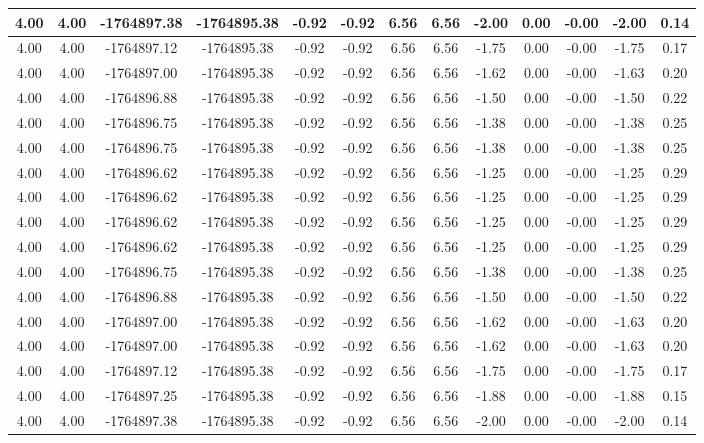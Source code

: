 \begin{table}[htbp]
\begin{adjustbox}{angle=90}
\begin{tabular}{|c|c|c|c|c|c|c|c|c|c|c|c|c|}
 4.00 & 4.00 & -1764897.38 & -1764895.38 & -0.92 & -0.92 & 6.56 & 6.56 & -2.00 & 0.00 & -0.00 & -2.00 & 0.14\\ \hline
 4.00 & 4.00 & -1764897.12 & -1764895.38 & -0.92 & -0.92 & 6.56 & 6.56 & -1.75 & 0.00 & -0.00 & -1.75 & 0.17\\ \hline
 4.00 & 4.00 & -1764897.00 & -1764895.38 & -0.92 & -0.92 & 6.56 & 6.56 & -1.62 & 0.00 & -0.00 & -1.63 & 0.20\\ \hline
 4.00 & 4.00 & -1764896.88 & -1764895.38 & -0.92 & -0.92 & 6.56 & 6.56 & -1.50 & 0.00 & -0.00 & -1.50 & 0.22\\ \hline
 4.00 & 4.00 & -1764896.75 & -1764895.38 & -0.92 & -0.92 & 6.56 & 6.56 & -1.38 & 0.00 & -0.00 & -1.38 & 0.25\\ \hline
 4.00 & 4.00 & -1764896.75 & -1764895.38 & -0.92 & -0.92 & 6.56 & 6.56 & -1.38 & 0.00 & -0.00 & -1.38 & 0.25\\ \hline
 4.00 & 4.00 & -1764896.62 & -1764895.38 & -0.92 & -0.92 & 6.56 & 6.56 & -1.25 & 0.00 & -0.00 & -1.25 & 0.29\\ \hline
 4.00 & 4.00 & -1764896.62 & -1764895.38 & -0.92 & -0.92 & 6.56 & 6.56 & -1.25 & 0.00 & -0.00 & -1.25 & 0.29\\ \hline
 4.00 & 4.00 & -1764896.62 & -1764895.38 & -0.92 & -0.92 & 6.56 & 6.56 & -1.25 & 0.00 & -0.00 & -1.25 & 0.29\\ \hline
 4.00 & 4.00 & -1764896.62 & -1764895.38 & -0.92 & -0.92 & 6.56 & 6.56 & -1.25 & 0.00 & -0.00 & -1.25 & 0.29\\ \hline
 4.00 & 4.00 & -1764896.75 & -1764895.38 & -0.92 & -0.92 & 6.56 & 6.56 & -1.38 & 0.00 & -0.00 & -1.38 & 0.25\\ \hline
 4.00 & 4.00 & -1764896.88 & -1764895.38 & -0.92 & -0.92 & 6.56 & 6.56 & -1.50 & 0.00 & -0.00 & -1.50 & 0.22\\ \hline
 4.00 & 4.00 & -1764897.00 & -1764895.38 & -0.92 & -0.92 & 6.56 & 6.56 & -1.62 & 0.00 & -0.00 & -1.63 & 0.20\\ \hline
 4.00 & 4.00 & -1764897.00 & -1764895.38 & -0.92 & -0.92 & 6.56 & 6.56 & -1.62 & 0.00 & -0.00 & -1.63 & 0.20\\ \hline
 4.00 & 4.00 & -1764897.12 & -1764895.38 & -0.92 & -0.92 & 6.56 & 6.56 & -1.75 & 0.00 & -0.00 & -1.75 & 0.17\\ \hline
 4.00 & 4.00 & -1764897.25 & -1764895.38 & -0.92 & -0.92 & 6.56 & 6.56 & -1.88 & 0.00 & -0.00 & -1.88 & 0.15\\ \hline
 4.00 & 4.00 & -1764897.38 & -1764895.38 & -0.92 & -0.92 & 6.56 & 6.56 & -2.00 & 0.00 & -0.00 & -2.00 & 0.14\\ \hline

\end{tabular}
\end{adjustbox}
\end{table}
